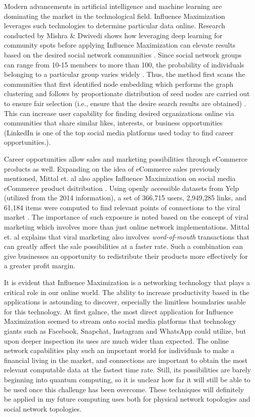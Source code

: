 \documentclass[12pt]{article}
\begin{document}
Modern advancements in artificial intelligence and machine learning are dominating the market in the technological field. 
Influence Maximization leverages such technologies to determine particular data online. 
Research conducted by Mishra \& Dwivedi shows how leveraging deep learning for community spots before applying Influence Maximization can elevate results based on the desired social network communities \cite{10053447}. 
Since social network groups can range from 10-15 members to more than 100, the probability of individuals belonging to a particular group varies widely \cite{10053447}. 
Thus, the method first scans the communities that first identified node embedding which performs the graph clustering and follows by proportionate distribution of seed nodes are carried out to ensure fair selection (i.e., ensure that the desire search results are obtained) \cite{10053447}. 
This can increase user capability for finding desired organizations online via communities that share similar likes, interests, or business opportunities (LinkedIn is one of the top social media platforms used today to find career opportunities.).

Career opportunities allow sales and marketing possibilities through eCommerce products as well. 
Expanding on the idea of eCommerce sales previously mentioned, Mittal et. al also applies Influence Maximization on social media eCommerce product dsitribution \cite{10072595}. 
Using openly accessible datasets from Yelp (utilized from the 2014 information), a set of 366,715 users, 2,949,285 links, and 61,184 items were computed to find relevant points of connections to the viral market \cite{10072595}. 
The importance of such exposure is noted based on the concept of viral marketing which involves more than just online network implementations. 
Mittal et. al explains that viral marketing also involves \emph{word-of-mouth} transactions that can greatly affect the sale possibilities at a faster rate. 
Such a combination can give businesses an opportunity to redistribute their products more effectively for a greater profit margin.

It is evident that Influence Maximization is a networking technology that plays a critical role in our online world. 
The ability to increase productivity based in the applications is astounding to discover, especially the limitless boundaries usable for this technology. 
At first galnce, the most direct application for Influence Maximization seemed to stream onto social media platforms that technology giants such as Facebook, Snapchat, Instagram and WhatsApp could utilize, but upon deeper inspection its uses are much wider than expected. 
The online network capabilities play such an important world for individuals to make a financial living in the market, and connections are important to obtain the most relevant computable data at the fastest time rate. 
Still, its possibilities are barely beginning into quantum computing, so it is unclear how far it will still be able to be used once this challenge has been overcome. 
These techniques will definitely be applied in my future computing uses both for physical network topologies and social network topologies.
\end{document}
